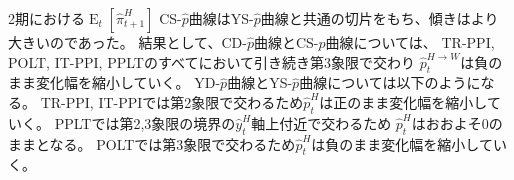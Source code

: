 \begin{enumerate}
\begin{description}[style=nextline]
               
                2期における\(\operatorname{E}_t[\hat{\pi}_{t+1}^H]\)
                CS-\(\hat{p}\)曲線はYS-\(\hat{p}\)曲線と共通の切片をもち、傾きはより大きいのであった。
                結果として、CD-\(\hat{p}\)曲線とCS-\(\hat{p}\)曲線については、
                TR-PPI, POLT, IT-PPI, PPLTのすべてにおいて引き続き第3象限で交わり
                \(\hat{p}_t^{H\to W}\)は負のまま変化幅を縮小していく。
                YD-\(\hat{p}\)曲線とYS-\(\hat{p}\)曲線については以下のようになる。
                TR-PPI, IT-PPIでは第2象限で交わるため\(\hat{p}_t^H\)は正のまま変化幅を縮小していく。
                PPLTでは第2,3象限の境界の\(\hat{y}_t^H\)軸上付近で交わるため
                \(\hat{p}_t^H\)はおおよそ\(0\)のままとなる。
                POLTでは第3象限で交わるため\(\hat{p}_t^H\)は負のまま変化幅を縮小していく。

        \end{description}
\end{enumerate}